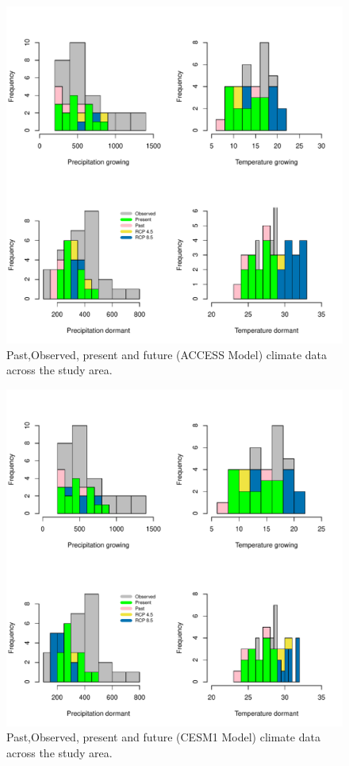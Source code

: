\documentclass[12pt]{article}
\begin{document}
\begin{figure}[H]
		\centering
		\includegraphics[width=0.99\linewidth]{Figures/ACCESS.pdf}
		\caption{Past,Observed, present and future (ACCESS Model) climate data across the study area.}
		\label{Sup:projectionACCESS}
\end{figure}

\begin{figure}[H]
		\centering
		\includegraphics[width=0.99\linewidth]{Figures/CESM1.pdf}
		\caption{Past,Observed, present and future (CESM1 Model) climate data across the study area.}
		\label{Sup:projectionCESM1}
\end{figure}
\end{document}
